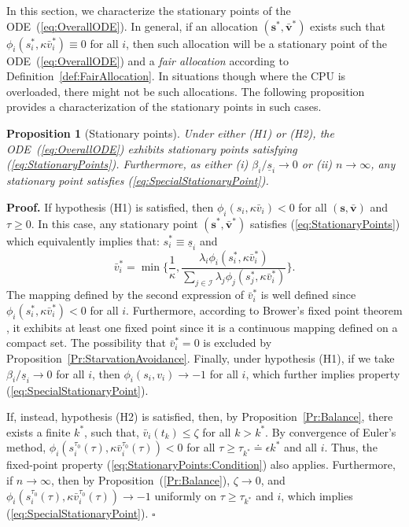 \documentclass[letter,11pt]{article}
\newtheorem{proposition}{Proposition}[section]
\newenvironment{proof}{\textbf{Proof.}}{$\square$\\}
\begin{document}
In this section, we characterize the stationary points of the ODE~(\ref{eq:OverallODE}). In general, if an allocation $({\mathbf{s}}^*,{\bar{\mathbf{v}}}^*)$ exists such that $\phi_i(s_i^*,\kappa{\bar{v}}_i^*)\equiv{0}$ for all $i$, then such allocation will be a stationary point of the ODE~(\ref{eq:OverallODE}) and a \textit{fair allocation} according to Definition~\ref{def:FairAllocation}. In situations though where the CPU is overloaded, there might not be such allocations. The following proposition provides a characterization of the stationary points in such cases.

\begin{proposition}[Stationary points]  \label{Pr:StationaryPoints}
Under either (H1) or (H2), the ODE~(\ref{eq:OverallODE}) exhibits stationary points satisfying  (\ref{eq:StationaryPoints}). Furthermore, as either (i) $\beta_i/\underline{s}_i\to{0}$ or (ii) $n\to\infty$, any stationary point satisfies (\ref{eq:SpecialStationaryPoint}).
\end{proposition}
\begin{proof}
  If hypothesis (H1) is satisfied, then $\phi_i(s_i,\kappa{\bar{v}}_i)<0$ for all $({\mathbf{s}},{\bar{\mathbf{v}}})$ and $\tau\geq{0}$. In this case, any stationary point $({\mathbf{s}}^*,{\bar{\mathbf{v}}}^*)$ satisfies (\ref{eq:StationaryPoints}) which equivalently implies that: $s_i^* \equiv \underline{s}_i$ and 
  \begin{equation} \label{eq:StationaryPoints:Condition}
  {\bar{v}}_i^* = \min\Big\{\frac{1}{\kappa}, \frac{\lambda_i\phi_i(s_i^*,\kappa{\bar{v}}_i^*)}{\sum_{j\in\mathcal{I}}\lambda_j\phi_j(s_j^*,\kappa{\bar{v}}_i^*)}\Big\}.
  \end{equation}
The mapping defined by the second expression of ${\bar{v}}_i^*$ is well defined since $\phi_i(s_i^*,\kappa{\bar{v}}_i^*)<0$ for all $i$. Furthermore, according to Brower's fixed point theorem \cite[Corollary~6.6]{Border85}, it exhibits at least one fixed point since it is a continuous mapping defined on a compact set. The possibility that ${\bar{v}}_i^*=0$ is excluded by Proposition~\ref{Pr:StarvationAvoidance}. Finally, under hypothesis (H1), if we take $\beta_i/\underline{s}_i \to 0$ for all $i$, then $\phi_i(s_i,v_i)\to{-1}$ for all $i$, which further implies property (\ref{eq:SpecialStationaryPoint}).
  
If, instead, hypothesis (H2) is satisfied, then, by Proposition~\ref{Pr:Balance}, there exists a finite $k^*$, such that, ${\bar{v}}_i(t_k) \leq \zeta$ for all $k>k^*$. By convergence of Euler's method, $\phi_i(s_i^{\tau_0}(\tau),\kappa{\bar{v}}_i^{\tau_0}(\tau))<0$ for all $\tau\geq\tau_{k^*}{\doteq}\epsilon{k^*}$ and all $i$. Thus, the fixed-point property (\ref{eq:StationaryPoints:Condition}) also applies. Furthermore, if $n\to{\infty}$, then by Proposition~(\ref{Pr:Balance}), $\zeta\to{0}$, and $\phi_i(s_i^{\tau_0}(\tau),\kappa{\bar{v}}_i^{\tau_0}(\tau))\to{-1}$ uniformly on $\tau\geq\tau_{k^*}$ and $i$, which implies (\ref{eq:SpecialStationaryPoint}).
\end{proof}
\end{document}
